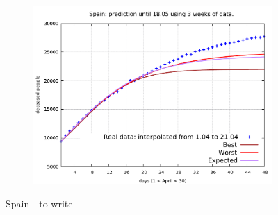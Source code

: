 \documentclass[8pt]{article}
\begin{document}
\begin{figure}[h!]
\begin{subfigure}[b]{0.45\linewidth}
  \includegraphics[width=\linewidth]{../simulations/sp/1-21/1-21.pdf}
  \end{subfigure}
	\caption{Spain - to write}
\end{figure}
\end{document}
